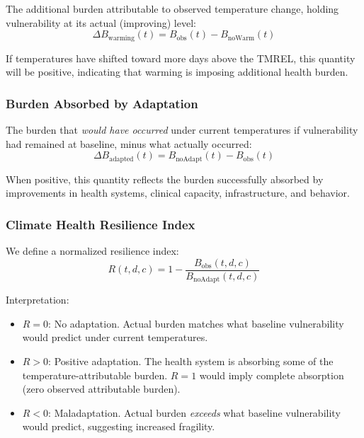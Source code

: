 \documentclass[11pt,a4paper]{article}
\begin{document}
The additional burden attributable to observed temperature change, holding vulnerability at its actual (improving) level:
\begin{equation}
  \Delta B_{\text{warming}}(t) = B_{\text{obs}}(t) - B_{\text{noWarm}}(t)
  \label{eq:excess}
\end{equation}

If temperatures have shifted toward more days above the TMREL, this quantity will be positive, indicating that warming is imposing additional health burden.

\subsubsection{Burden Absorbed by Adaptation}

The burden that \emph{would have occurred} under current temperatures if vulnerability had remained at baseline, minus what actually occurred:
\begin{equation}
  \Delta B_{\text{adapted}}(t) = B_{\text{noAdapt}}(t) - B_{\text{obs}}(t)
  \label{eq:adapted}
\end{equation}

When positive, this quantity reflects the burden successfully absorbed by improvements in health systems, clinical capacity, infrastructure, and behavior.

\subsubsection{Climate Health Resilience Index}

We define a normalized resilience index:
\begin{equation}
  \boxed{\;R(t,d,c) = 1 - \frac{B_{\text{obs}}(t,d,c)}{B_{\text{noAdapt}}(t,d,c)}\;}
  \label{eq:resilience}
\end{equation}

Interpretation:
\begin{itemize}[nosep]
  \item $R = 0$: No adaptation. Actual burden matches what baseline vulnerability would predict under current temperatures.
  \item $R > 0$: Positive adaptation. The health system is absorbing some of the temperature-attributable burden. $R = 1$ would imply complete absorption (zero observed attributable burden).
  \item $R < 0$: Maladaptation. Actual burden \emph{exceeds} what baseline vulnerability would predict, suggesting increased fragility.
\end{itemize}
\end{document}

